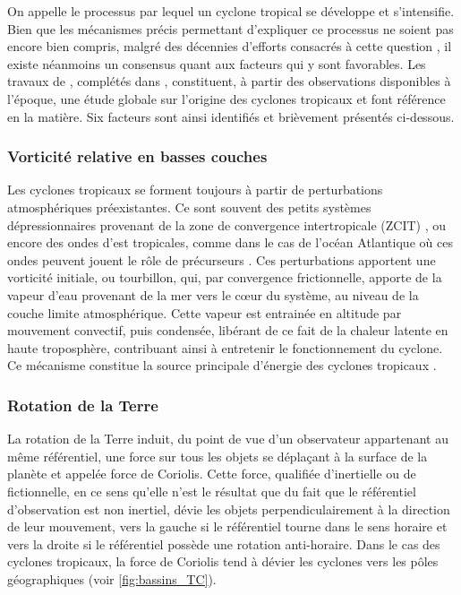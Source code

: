 \documentclass[../main.tex]{subfiles}
\begin{document}
On appelle  le processus par lequel un cyclone tropical se développe et s'intensifie. Bien que les mécanismes précis permettant
d'expliquer ce processus ne soient pas encore bien compris, malgré des décennies d'efforts consacrés à cette question \parencite{yanai_formation_1964, gray_global_1968, 
montgomery_tropical_1993, gray_formation_1998, tory_tropical_2010}, il existe néanmoins un consensus quant aux facteurs qui y sont favorables. Les travaux de
\cite{gray_global_1968}, complétés dans \cite{gray_tropical_1975}, constituent, à partir des observations disponibles à l'époque, une étude globale sur
l'origine des cyclones tropicaux et font référence en la matière. Six facteurs sont ainsi identifiés et brièvement présentés ci-dessous.

\subsubsection*{Vorticité relative en basses couches}

Les cyclones tropicaux se forment toujours à partir de perturbations atmosphériques préexistantes. Ce sont souvent des petits systèmes dépressionnaires
provenant de la zone de convergence intertropicale (ZCIT) \parencite{gray_global_1968}, ou encore des ondes d'est tropicales, comme dans le cas de l'océan
Atlantique où ces ondes peuvent jouent le rôle de précurseurs \parencite{thorncroft_african_2001,patricola_response_2018}. Ces perturbations apportent une
vorticité initiale, ou tourbillon, qui, par convergence frictionnelle, apporte de la vapeur d'eau provenant de la mer vers le cœur du système, au niveau de la
couche limite atmosphérique. Cette vapeur est entrainée en altitude par mouvement convectif, puis condensée, libérant de ce fait de la chaleur latente en haute
troposphère, contribuant ainsi à entretenir le fonctionnement du cyclone. Ce mécanisme constitue la source principale d'énergie des cyclones tropicaux
\parencite{emanuel_dependence_1987}.

\subsubsection*{Rotation de la Terre}

La rotation de la Terre induit, du point de vue d'un observateur appartenant au même référentiel, une force sur tous les objets se déplaçant à la surface de la
planète et appelée force de Coriolis. Cette force, qualifiée d'inertielle ou de fictionnelle, en ce sens qu'elle n'est le résultat que du fait que le
référentiel d'observation est non inertiel, dévie les objets perpendiculairement à la direction de leur mouvement, vers la gauche si le référentiel tourne dans
le sens horaire et vers la droite si le référentiel possède une rotation anti-horaire. Dans le cas des cyclones tropicaux, la force de Coriolis tend à dévier
les cyclones vers les pôles géographiques (voir \cref{fig:bassins_TC}).
\end{document}
